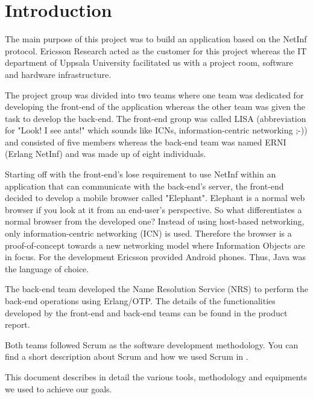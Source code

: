 \section{Introduction}
The main purpose of this project was to build an application based on the NetInf protocol. Ericsson Research acted as the customer 
for this project whereas the IT department of Uppsala University facilitated us with a project room, software and hardware infrastructure.

The project group was divided into two teams where one team was dedicated for developing the front-end of the 
application whereas the other team was given the task to develop the back-end. The front-end group was called 
LISA (abbreviation for "Look! I see ants!" which sounds like ICNs, information-centric networking ;-)) and consisted of five members whereas 
the back-end team was named ERNI (Erlang NetInf) and was made up of eight individuals. 

Starting off with the front-end's lose requirement to use NetInf within an application that can communicate with
the back-end's server, the front-end decided to develop a mobile browser called "Elephant". Elephant is a normal
web browser if you look at it from an end-user's perspective. So what differentiates a normal browser
from the developed one? Instead of using host-based networking, only information-centric networking (ICN) is used.
Therefore the browser is a proof-of-concept towards a new networking model where Information Objects are in focus.
For the development Ericsson provided Android phones. Thus, Java was the language of choice.

The back-end team developed the Name Resolution Service (NRS) to perform the back-end operations using Erlang/OTP. The details of the functionalities developed 
by the front-end and back-end teams can be found in the product report. 

Both teams followed Scrum as the software development methodology. You can find a short description about Scrum and
how we used Scrum in .

This document describes in detail the various tools, methodology and equipments we used to achieve our goals. 